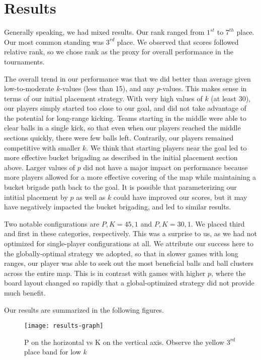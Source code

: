 \documentclass[
10pt, %
letterpaper, %
oneside, %
headinclude,footinclude, %
english
]{article}
\begin{document}
\section{Results}
Generally speaking, we had mixed results. Our rank ranged from $1^{st}$ to $7^{th}$ place. Our most common standing was $3^{rd}$ place. We observed that scores followed relative rank, so we chose rank as the proxy for overall performance in the tournaments.

The overall trend in our performance was that we did better than average given low-to-moderate $k$-values (less than 15), and any $p$-values. This makes sense in terms of our initial placement strategy. With very high values of $k$ (at least 30), our players simply started too close to our goal, and did not take advantage of the potential for long-range kicking. Teams starting in the middle were able to clear balls in a single kick, so that even when our players reached the middle sections quickly, there were few balls left. Contrarily, our players remained competitive with smaller $k$. We think that starting players near the goal led to more effective bucket brigading as described in the initial placement section above. Larger values of $p$ did not have a major impact on performance because more players allowed for a more effective covering of the map while maintaining a bucket brigade path back to the goal. It is possible that parameterizing our intitial placement by $p$ as well as $k$ could have improved our scores, but it may have negatively impacted the bucket brigading, and led to similar results.

Two notable configurations are $P,K=45,1$ and $P,K=30,1$. We placed third and first in these categories, respectively. This was a surprise to us, as we had not optimized for single-player configurations at all. We attribute our success here to the globally-optimal strategy we adopted, so that in slower games with long ranges, our player was able to seek out the most beneficial balls and ball clusters across the entire map. This is in contrast with games with higher $p$, where the board layout changed so rapidly that a global-optimized strategy did not provide much benefit. 

Our results are summarized in the following figures. 

\begin{figure}[h]
\centering 
\texttt{[image: results-graph]} 
\caption[Group 5 tournament results as a function of P and K]{P on the horizontal vs K on the vertical axis. Observe the yellow $3^{rd}$ place band for low $k$}
\label{fig:gallery2} 
\end{figure}
\end{document}
